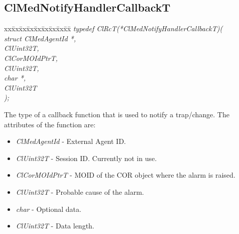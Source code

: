 \begin{flushleft}
\subsection{ClMedNotifyHandlerCallbackT}
\begin{tabbing}
xx\=xx\=xx\=xx\=xx\=xx\=xx\=xx\=xx\=\kill
\textit{typedef ClRcT(*ClMedNotifyHandlerCallbackT)(}\\
\>\>\>\>\textit{struct ClMedAgentId *,}\\
\>\>\>\>\textit{ClUint32T, }\\
\>\>\>\>\textit{ClCorMOIdPtrT,}\\
\>\>\>\>\textit{ClUint32T,}\\
\>\>\>\>\textit{char *,}\\
\>\>\>\>\textit{ClUint32T}\\
\textit{);}\end{tabbing}
The type of a callback function that is used to notify a trap/change. The attributes of the function are:
\begin{itemize}
\item
\textit{ClMedAgentId} - External Agent ID.
\item
\textit{ClUint32T} - Session ID. Currently not in use.
\item
\textit{ClCorMOIdPtrT} - MOID of the COR object where the alarm is raised.
\item
\textit{ClUint32T} - Probable cause of the alarm.
\item
\textit{char} - Optional data.
\item
\textit{ClUint32T} - Data length.
\end{itemize}




\end{flushleft}
